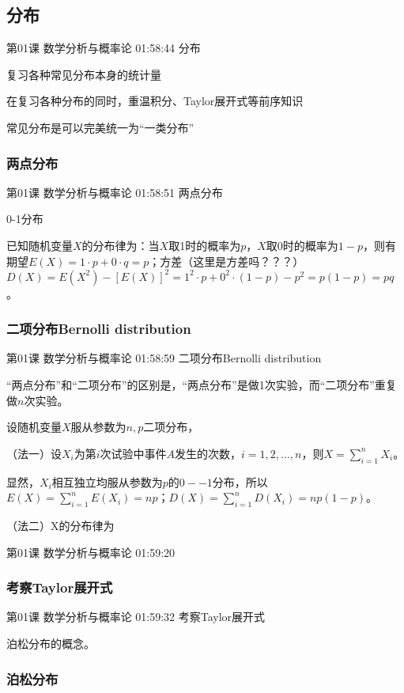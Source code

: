 \documentclass[UTF8]{ctexart}
\begin{document}
\subsection{分布}

第01课 数学分析与概率论 01:58:44 分布

复习各种常见分布本身的统计量

在复习各种分布的同时，重温积分、Taylor展开式等前序知识

常见分布是可以完美统一为“一类分布”

\subsubsection{两点分布}

第01课 数学分析与概率论 01:58:51 两点分布

0-1分布

已知随机变量$X$的分布律为：当$X$取1时的概率为$p$，$X$取0时的概率为$1-p$，则有期望$E(X)=1\cdot p + 0 \cdot q = p$；方差（这里是方差吗？？？）$D(X)=E(X^{2})-[E(X)]^{2}=1^{2} \cdot p + 0^{2} \cdot (1-p) - p^{2} =p(1-p)= pq$。

\subsubsection{二项分布Bernolli distribution}

第01课 数学分析与概率论 01:58:59 二项分布Bernolli distribution

“两点分布”和“二项分布”的区别是，“两点分布”是做1次实验，而“二项分布”重复做$n$次实验。

设随机变量$X$服从参数为$n,p$二项分布，

（法一）设$X_{i}$为第$i$次试验中事件$A$发生的次数，$i=1,2,\dots,n$，则$X=\sum_{i=1}^{n}X_{i}$。

显然，$X_{i}$相互独立均服从参数为$p$的$0--1$分布，所以$E(X)=\sum_{i=1}^{n}E(X_{i})=np$；$D(X)=\sum_{i=1}^{n}D(X_{i})=np(1-p)$。

（法二）X的分布律为

第01课 数学分析与概率论 01:59:20

\subsubsection{考察Taylor展开式}

第01课 数学分析与概率论 01:59:32 考察Taylor展开式

泊松分布的概念。

\subsubsection{泊松分布}
\end{document}

